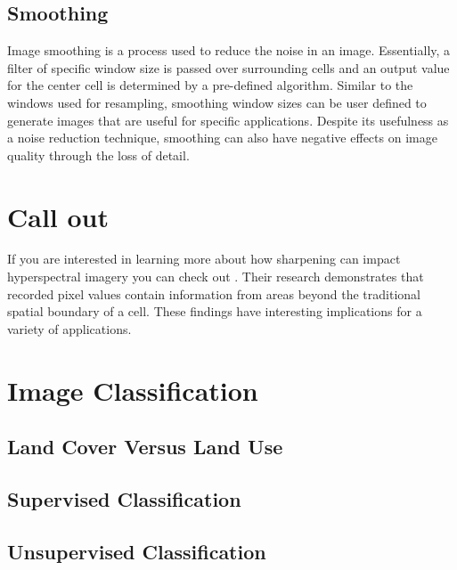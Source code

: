 \documentclass[
]{book}
\begin{document}
\hypertarget{smoothing}{%
\subsection{Smoothing}\label{smoothing}}

Image smoothing is a process used to reduce the noise in an image. Essentially, a filter of specific window size is passed over surrounding cells and an output value for the center cell is determined by a pre-defined algorithm. Similar to the windows used for resampling, smoothing window sizes can be user defined to generate images that are useful for specific applications. Despite its usefulness as a noise reduction technique, smoothing can also have negative effects on image quality through the loss of detail.

\hypertarget{call-out-2}{%
\section*{Call out}\label{call-out-2}}

If you are interested in learning more about how sharpening can impact hyperspectral imagery you can check out \citep{inamdar_characterizing_2020}. Their research demonstrates that recorded pixel values contain information from areas beyond the traditional spatial boundary of a cell. These findings have interesting implications for a variety of applications.

\hypertarget{image-classification}{%
\section{Image Classification}\label{image-classification}}

\hypertarget{land-cover-versus-land-use}{%
\subsection{Land Cover Versus Land Use}\label{land-cover-versus-land-use}}

\hypertarget{supervised-classification}{%
\subsection{Supervised Classification}\label{supervised-classification}}

\hypertarget{unsupervised-classification}{%
\subsection{Unsupervised Classification}\label{unsupervised-classification}}
\end{document}
